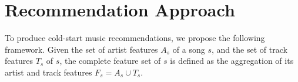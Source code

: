 

\section{Recommendation Approach}
\label{sec:cold-rec:approach}



To produce cold-start music recommendations, we propose the following framework.
Given the set of artist features $A_{s}$ of a song $s$, and the set of track features $T_{s}$ of $s$, the complete feature set of $s$ is defined as the aggregation of its artist and track features $F_{s} = A_{s} \cup T_{s}$.


